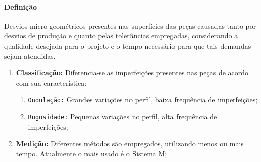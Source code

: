 \documentclass{article}
\begin{document}
        \paragraph{Definição}Desvios micro geométricos presentes nas superfícies das peças causadas tanto por desvios de produção e quanto pelas tolerâncias empregadas, considerando a qualidade desejada para o projeto e o tempo necessário para que tais demandas sejam atendidas.
            \begin{enumerate}[rightmargin = \leftmargin, noitemsep]
                \item \textbf{Classificação:} Diferencia-se as imperfeições presentes nas peças de acordo com sua característica:
                    \begin{enumerate}[rightmargin = \leftmargin, noitemsep]
                        \item \texttt{Ondulação:} Grandes variações no perfil, baixa frequência de imperfeições;
                        \item \texttt{Rugosidade:} Pequenas variações no perfil, alta frequência de imperfeições;
                    \end{enumerate}

                \item \textbf{Medição:} Diferentes métodos são empregados, utilizando menos ou mais tempo. Atualmente o mais usado é o Sistema M;


\end{enumerate}
\end{document}
